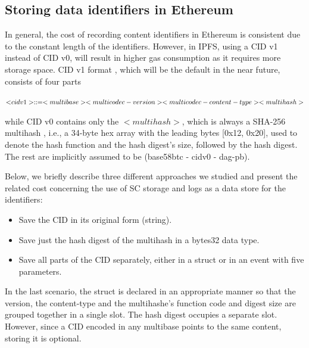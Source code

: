 

\subsection{Storing data identifiers in Ethereum}\label{subsection:evaluation_identifiers}
In general, the cost of recording content identifiers in Ethereum is consistent due to the constant length of the identifiers. However, in IPFS, using a CID v1 instead of CID v0, will result in higher gas consumption as it requires more storage space. CID v1 format \citep{multiformat}, which will be the default in the near future, consists of four parts


\begin{flushleft}
\centering
$\textsc <cidv1> ::= <multibase><multicodec-version><multicodec-content-type><multihash>$
\end{flushleft}

while CID v0 contains only the \(\scriptstyle <multihash>\), which is always a SHA-256 multihash \citep{multiformat}, i.e., a 34-byte hex array with the leading bytes [0x12, 0x20], used to denote the hash function and the hash digest’s size, followed by the hash digest. The rest are implicitly assumed to be (base58btc - cidv0 - dag-pb).

Below, we briefly describe three different approaches we studied and present the related cost concerning the use of SC storage and logs as a data store for the identifiers:

\begin{itemize}[topsep=0pt, itemsep=0pt]
\item{Save the CID in its original form (string).}
\item{Save just the hash digest of the multihash in a bytes32 data type.} 
\item{Save all parts of the CID separately, either in a struct or in an event with five parameters.}
\end{itemize}

In the last scenario, the struct is declared in an appropriate manner so that the version, the content-type and the multihashe’s function code and digest size are grouped together in a single slot. The hash digest occupies a separate slot. However, since a CID encoded in any multibase points to the same content, storing it is optional.

